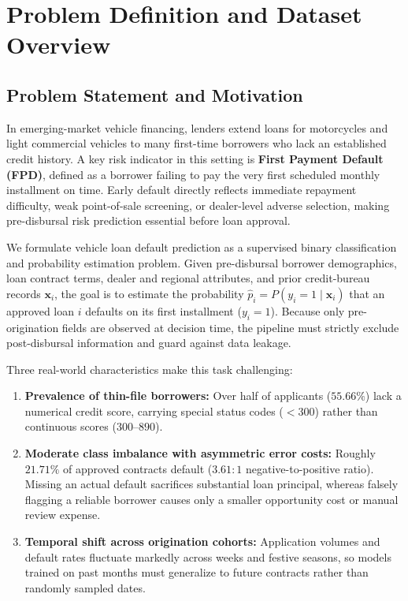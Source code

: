 \section{Problem Definition and Dataset Overview}
\label{sec:problem_data}

\subsection{Problem Statement and Motivation}
In emerging-market vehicle financing, lenders extend loans for motorcycles and light commercial vehicles to many first-time borrowers who lack an established credit history. A key risk indicator in this setting is \textbf{First Payment Default (FPD)}, defined as a borrower failing to pay the very first scheduled monthly installment on time. Early default directly reflects immediate repayment difficulty, weak point-of-sale screening, or dealer-level adverse selection, making pre-disbursal risk prediction essential before loan approval.

We formulate vehicle loan default prediction as a supervised binary classification and probability estimation problem. Given pre-disbursal borrower demographics, loan contract terms, dealer and regional attributes, and prior credit-bureau records $\mathbf{x}_i$, the goal is to estimate the probability $\hat{p}_i = P(y_i = 1 \mid \mathbf{x}_i)$ that an approved loan $i$ defaults on its first installment ($y_i = 1$). Because only pre-origination fields are observed at decision time, the pipeline must strictly exclude post-disbursal information and guard against data leakage.

Three real-world characteristics make this task challenging:
\begin{enumerate}
  \item \textbf{Prevalence of thin-file borrowers:} Over half of applicants ($55.66\%$) lack a numerical credit score, carrying special status codes ($<300$) rather than continuous scores ($300\text{--}890$).
  \item \textbf{Moderate class imbalance with asymmetric error costs:} Roughly $21.71\%$ of approved contracts default ($3.61{:}1$ negative-to-positive ratio). Missing an actual default sacrifices substantial loan principal, whereas falsely flagging a reliable borrower causes only a smaller opportunity cost or manual review expense.
  \item \textbf{Temporal shift across origination cohorts:} Application volumes and default rates fluctuate markedly across weeks and festive seasons, so models trained on past months must generalize to future contracts rather than randomly sampled dates.
\end{enumerate}

